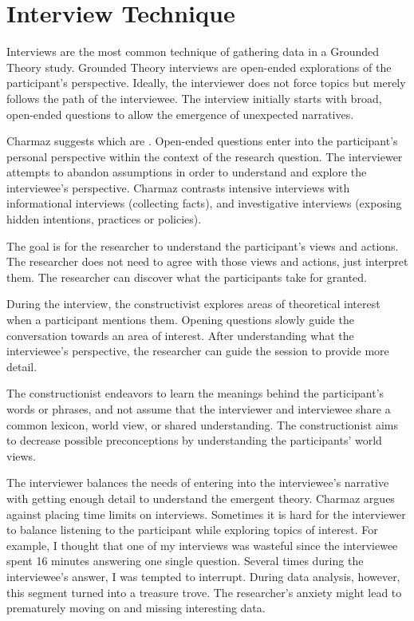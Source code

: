 \section{Interview Technique}
Interviews are the most common technique of gathering data in a Grounded Theory study. Grounded Theory interviews are open-ended explorations of the participant's perspective. Ideally, the interviewer does not force topics but merely follows the path of the interviewee. The interview initially starts with broad, open-ended questions to allow the emergence of unexpected narratives. 

Charmaz suggests  which are  \cite{Charmaz}. Open-ended questions enter into the participant's personal perspective within the context of the research question. The interviewer attempts to abandon assumptions in order to understand and explore the interviewee's perspective. Charmaz \cite{Charmaz} contrasts intensive interviews with informational interviews (collecting facts), and investigative interviews (exposing hidden intentions, practices or policies).

The goal is for the researcher to understand the participant's views and actions. The researcher does not need to agree with those views and actions, just interpret them. The researcher can discover what the participants take for granted.

During the interview, the constructivist explores areas of theoretical interest when a participant mentions them. Opening questions slowly guide the conversation towards an area of interest. After understanding what the interviewee's perspective, the researcher can guide the session to provide more detail.

The constructionist endeavors to learn the meanings behind the participant's words or phrases, and not assume that the interviewer and interviewee share a common lexicon, world view, or shared understanding. The constructionist aims to decrease possible preconceptions by understanding the participants' world views. 

The interviewer balances the needs of entering into the interviewee's narrative with getting enough detail to understand the emergent theory. Charmaz argues against placing time limits on interviews. Sometimes it is hard for the interviewer to balance listening to the participant while exploring topics of interest. For example, I thought that one of my interviews was wasteful since the interviewee spent 16 minutes answering one single question. Several times during the interviewee's answer, I was tempted to interrupt. During data analysis, however, this segment turned into a treasure trove. The researcher's anxiety might lead to prematurely moving on and missing interesting data. 

